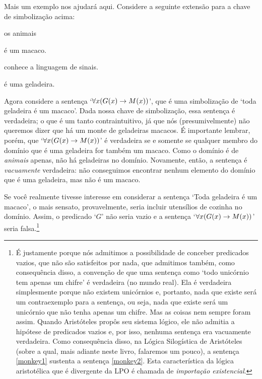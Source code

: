 Mais um exemplo nos ajudará aqui.
Considere a seguinte extensão para a chave de simbolização acima:
		\begin{center}
		\begin{ekey}
			\item[\text{domínio}] os animais
			\item[\atom{M}{x}]  é um macaco.
			\item[\atom{L}{x}]  conhece a linguagem de sinais.
			\item[\atom{G}{x}]  é uma geladeira.
		\end{ekey}
		\end{center}
Agora considere a sentença `$\forall x(\mathord{G}(x) \rightarrow \mathord{M}(x))$', que é uma simbolização de `toda geladeira é um macaco'.
Dada nossa chave de simbolização, essa sentença é verdadeira; o que é um tanto contraintuitivo, já que nós (presumivelmente) não queremos dizer que há um monte de geladeiras macacos.
É importante lembrar, porém, que `$\forall x(\mathord{G}(x) \rightarrow \mathord{M}(x))$' é verdadeira se e somente se qualquer membro do domínio que é uma geladeira for também um macaco.
Como o domínio é de \emph{animais} apenas, não há geladeiras no domínio. Novamente, então, a sentença é \emph{vacuamente} verdadeira:
não conseguimos encontrar nenhum elemento do domínio que é uma geladeira, mas não é um macaco. 

Se você realmente tivesse interesse em considerar a sentença `Toda geladeira é um macaco', o mais sensato, provavelmente, seria incluir utensílios de cozinha no domínio.
Assim, o predicado `$G$' não seria vazio e a sentença `$\forall x(\mathord{G}(x) \rightarrow \mathord{M}(x))$' seria falsa.\footnote{
			É justamente porque nós admitimos a possibilidade de conceber predicados vazios, que não são satisfeitos por nada, que admitimos também, como consequência disso,  a convenção de que uma sentença como `todo unicórnio tem apenas um chifre' é verdadeira (no mundo real).
			Ela é verdadeira simplesmente porque não existem unicórnios e, portanto, nada que existe será um contraexemplo para a sentença, ou seja, nada que existe será um unicórnio que não tenha apenas um chifre.
			Mas as coisas nem sempre foram assim.
			Quando Aristóteles propôs seu sistema lógico, ele não admitia a hipótese de predicados vazios e, por isso, nenhuma sentença era vacuamente verdadeira.
			Como consequência disso, na Lógica Silogística de Aristóteles (sobre a qual, mais adiante neste livro, falaremos um pouco), a sentença \ref{monkey1} sustenta a sentença \ref{monkey2}.
			Esta característica da lógica aristotélica que é divergente da LPO é chamada de \emph{importação existencial}.}


